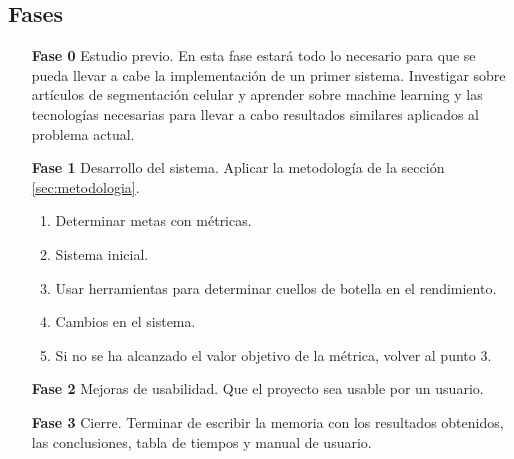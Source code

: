 \subsection{Fases}\label{subsec:fasesplanactualizado}

\begin{itemize}
\item[\textbf{Fase 0}] Estudio previo. En esta fase estará todo lo necesario para que se pueda llevar a cabe la implementación de un primer sistema. Investigar sobre artículos de segmentación celular y aprender sobre machine learning y las tecnologías necesarias para llevar a cabo resultados similares aplicados al problema actual.
\item[\textbf{Fase 1}] Desarrollo del sistema. Aplicar la metodología de la sección \ref{sec:metodologia}.
\begin{enumerate}
\item Determinar metas con métricas.
\item Sistema inicial.
\item Usar herramientas para determinar cuellos de botella en el rendimiento.
\item Cambios en el sistema.
\item Si no se ha alcanzado el valor objetivo de la métrica, volver al punto 3.
\end{enumerate}
\item[\textbf{Fase 2}] Mejoras de usabilidad. Que el proyecto sea usable por un usuario.
\item[\textbf{Fase 3}] Cierre. Terminar de escribir la memoria con los resultados obtenidos, las conclusiones, tabla de tiempos y manual de usuario.
\end{itemize}
